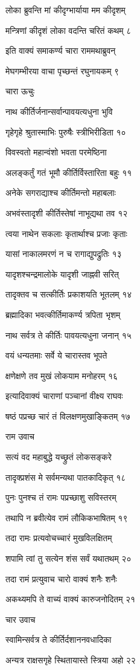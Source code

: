 लोका ब्रुवन्ति मां कीदृग्भार्याया मम कीदृशम्

मन्त्रिणां कीदृशं लोका वदन्ति चरितं कथम् ८

इति वाक्यं समाकर्ण्य चारा राममथाब्रुवन्

मेघगम्भीरया वाचा पृच्छन्तं रघुनायकम् ९

चारा ऊचुः

नाथ कीर्तिर्जनान्सर्वान्पावयत्यधुना भुवि

गृहेगृहे श्रुतास्माभिः पुरुषैः स्त्रीभिरीडिता १०

विवस्वतो महान्वंशो भवता परमेष्ठिना

अलङ्कर्तुं गतं भूमौ कीर्तिर्विस्तारिता बहुः ११

अनेके सगराद्याश्च कीर्तिमन्तो महाबलाः

अभवंस्तादृशी कीर्तिस्तेषां नाभूद्यथा तव १२

त्वया नाथेन सकलाः कृतार्थाश्च प्रजाः कृताः

यासां नाकालमरणं न च रागाद्युपद्रुतिः १३

यादृशश्चन्द्रमालोके यादृशी जाह्नवी सरित्

तादृक्तव च सत्कीर्तिः प्रकाशयति भूतलम् १४

ब्रह्मादिका भवत्कीर्तिमाकर्ण्य त्रपिता भृशम्

नाथ सर्वत्र ते कीर्तिः पावयत्यधुना जनान् १५

वयं धन्यतमाः सर्वे ये चारास्तव भूपते

क्षणेक्षणे तव मुखं लोकयाम मनोहरम् १६

इत्यादिवाक्यं चाराणां पञ्चानां वीक्ष्य राघवः

षष्ठं पप्रच्छ चारं तं विलक्षणमुखाङ्कितम् १७

राम उवाच

सत्यं वद महाबुद्धे यच्छ्रुतं लोकसङ्करे

तादृक्प्रशंस मे सर्वमन्यथा पातकादिकृत् १८

पुनः पुनश्च तं रामः पप्रच्छाशु सविस्तरम्

तथापि न ब्रवीत्येव रामं लौकिकभाषितम् १९

तदा रामः प्रत्यवोचच्चारं मुखविलक्षितम्

शपामि त्वां तु सत्येन शंस सर्वं यथातथम् २०

तदा रामं प्रत्युवाच चारो वाक्यं शनैः शनैः

अकथ्यमपि ते वाच्यं वाक्यं कारुजनोदितम् २१

चार उवाच

स्वामिन्सर्वत्र ते कीर्तिर्दशाननवधादिका

अन्यत्र राक्षसगृहे स्थितायास्ते स्त्रिया अहो २२

